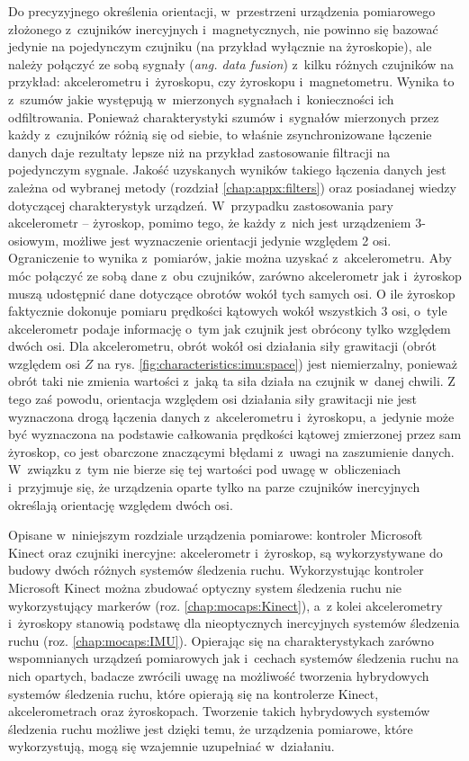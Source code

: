 Do precyzyjnego określenia orientacji, w~przestrzeni urządzenia pomiarowego złożonego z~czujników inercyjnych i~magnetycznych, nie powinno się bazować jedynie na pojedynczym czujniku (na przykład wyłącznie na żyroskopie), ale należy połączyć ze sobą sygnały (\emph{ang. data fusion}) z~kilku różnych czujników na przykład: akcelerometru i~żyroskopu, czy żyroskopu i~magnetometru. Wynika to z~szumów jakie występują w~mierzonych sygnałach i~konieczności ich odfiltrowania. Ponieważ charakterystyki szumów i~sygnałów mierzonych przez każdy z~czujników różnią się od siebie, to właśnie zsynchronizowane łączenie danych daje rezultaty lepsze niż na przykład zastosowanie filtracji na pojedynczym sygnale. Jakość uzyskanych wyników takiego łączenia danych jest zależna od wybranej metody (rozdział \ref{chap:appx:filters}) oraz posiadanej wiedzy dotyczącej charakterystyk urządzeń. W~przypadku zastosowania pary akcelerometr -- żyroskop, pomimo tego, że każdy z~nich jest urządzeniem 3-osiowym, możliwe jest wyznaczenie orientacji jedynie względem 2 osi. Ograniczenie to wynika z~pomiarów, jakie można uzyskać z~akcelerometru. Aby móc połączyć ze sobą dane z~obu czujników, zarówno akcelerometr jak i~żyroskop muszą udostępnić dane dotyczące obrotów wokół tych samych osi. O ile żyroskop faktycznie dokonuje pomiaru prędkości kątowych wokół wszystkich 3 osi, o~tyle akcelerometr podaje informację o~tym jak czujnik jest obrócony tylko względem dwóch osi. Dla akcelerometru, obrót wokół osi działania siły grawitacji (obrót względem osi $Z$ na rys. \ref{fig:characteristics:imu:space}) jest niemierzalny, ponieważ obrót taki nie zmienia wartości z~jaką ta siła działa na czujnik w~danej chwili. Z tego zaś powodu, orientacja względem osi działania siły grawitacji nie jest wyznaczona drogą łączenia danych z~akcelerometru i~żyroskopu, a~jedynie może być wyznaczona na podstawie całkowania prędkości kątowej zmierzonej przez sam żyroskop, co jest obarczone znaczącymi błędami z~uwagi na zaszumienie danych. W~związku z~tym nie bierze się tej wartości pod uwagę w~obliczeniach i~przyjmuje się, że urządzenia oparte tylko na parze czujników inercyjnych określają orientację względem dwóch osi.

Opisane w~niniejszym rozdziale urządzenia pomiarowe: kontroler Microsoft Kinect oraz czujniki inercyjne: akcelerometr i~żyroskop, są wykorzystywane do budowy dwóch różnych systemów śledzenia ruchu. Wykorzystując kontroler Microsoft Kinect można zbudować optyczny system śledzenia ruchu nie wykorzystujący markerów (roz. \ref{chap:mocaps:Kinect}), a~z kolei akcelerometry i~żyroskopy stanowią podstawę dla nieoptycznych inercyjnych systemów śledzenia ruchu (roz. \ref{chap:mocaps:IMU}). Opierając się na charakterystykach zarówno wspomnianych urządzeń pomiarowych jak i~cechach systemów śledzenia ruchu na nich opartych, badacze zwrócili uwagę na możliwość tworzenia hybrydowych systemów śledzenia ruchu, które opierają się na kontrolerze Kinect, akcelerometrach oraz żyroskopach. Tworzenie takich hybrydowych systemów śledzenia ruchu możliwe jest dzięki temu, że urządzenia pomiarowe, które wykorzystują, mogą się wzajemnie uzupełniać w~działaniu.
																																																			
